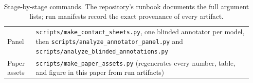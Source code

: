 \begin{table}[h]
\begin{tabular}{lp{8.6cm}}
    Panel & \texttt{scripts/make\_contact\_sheets.py}, one blinded annotator per model, then \texttt{scripts/analyze\_annotator\_panel.py} and \texttt{scripts/analyze\_blinded\_annotations.py} \\
    Paper assets & \texttt{scripts/make\_paper\_assets.py} (regenerates every number, table, and figure in this paper from run artifacts) \\
    \bottomrule
  \end{tabular}
  \caption{Stage-by-stage commands. The repository's runbook documents the full
  argument lists; run manifests record the exact provenance of every artifact.}
  \label{tab:commands}
\end{table}
